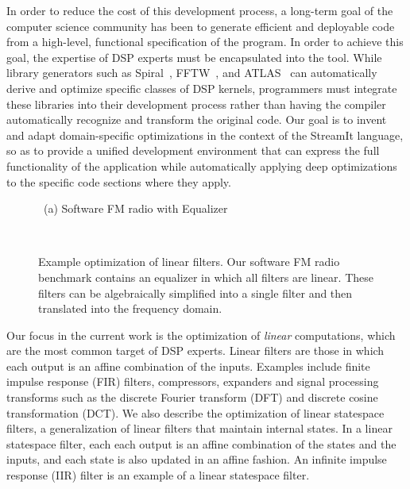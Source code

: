 In order to reduce the cost of this development process, a long-term
goal of the computer science community has been to generate efficient
and deployable code from a high-level, functional specification of the
program.  In order to achieve this goal, the expertise of DSP experts
must be encapsulated into the tool.  While library generators such as
Spiral~\cite{Spiral-SI}, FFTW~\cite{FFTW-SI}, and
ATLAS~\cite{ATLAS,ATLAS-Sparsity-SI} can automatically derive and
optimize specific classes of DSP kernels, programmers must integrate
these libraries into their development process rather than having the
compiler automatically recognize and transform the original code.  Our
goal is to invent and adapt domain-specific optimizations in the
context of the StreamIt language, so as to provide a unified
development environment that can express the full functionality of the
application while automatically applying deep optimizations to the
specific code sections where they apply.

\begin{figure}[t]

\mbox{~}{\small (a) Software FM radio with Equalizer}
\mbox{~}\hspace{0.35in}{\small (b) After linear combination}
\mbox{~}\hspace{0.15in}{\small (c) After translation to} \vspace{-0.2\baselineskip}

\mbox{~}\hspace{4.87in}{\small the frequency domain}
\caption[Example optimization of linear filters.]{Example optimization
  of linear filters.  Our software FM radio benchmark contains an
  equalizer in which all filters are linear.  These filters can be
  algebraically simplified into a single filter and then translated
  into the frequency domain. \protect\label{fig:equalizer}}
\end{figure}

Our focus in the current work is the optimization of {\it linear}
computations, which are the most common target of DSP experts.  Linear
filters are those in which each output is an affine combination of the
inputs.  Examples include finite impulse response (FIR) filters,
compressors, expanders and signal processing transforms such as the
discrete Fourier transform (DFT) and discrete cosine transformation
(DCT).  We also describe the optimization of linear statespace
filters, a generalization of linear filters that maintain internal
states.  In a linear statespace filter, each each output is an affine
combination of the states and the inputs, and each state is also
updated in an affine fashion.  An infinite impulse response (IIR)
filter is an example of a linear statespace filter.

